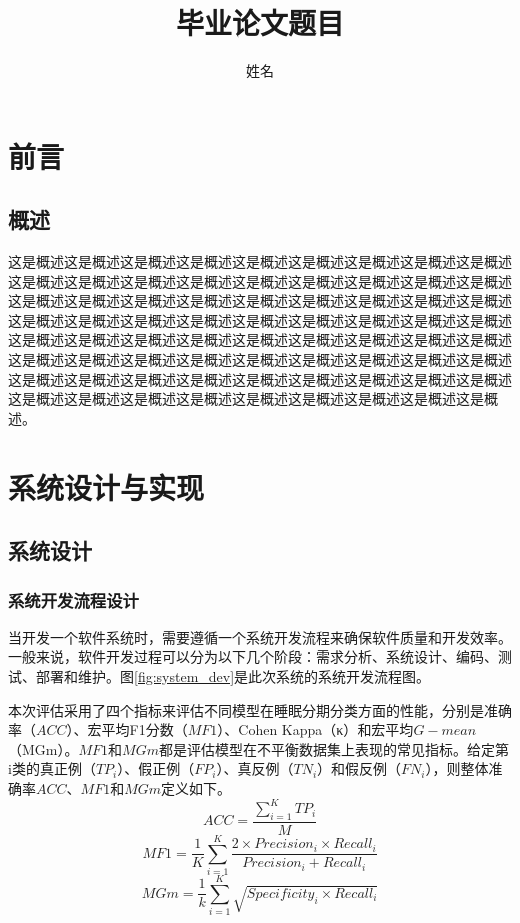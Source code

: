 \documentclass[12pt,a4paper]{SWUThesis}
\title{毕业论文题目}                           %
\author{姓名}                                 %
\begin{document}
\maketitle
\makecontents
\makeabstract
\section{前言}

\subsection{概述}
\par 这是概述这是概述这是概述这是概述这是概述这是概述这是概述这是概述这是概述这是概述这是概述这是概述这是概述这是概述这是概述这是概述这是概述这是概述这是概述这是概述这是概述这是概述这是概述这是概述这是概述这是概述这是概述这是概述这是概述这是概述这是概述这是概述这是概述这是概述这是概述这是概述这是概述这是概述这是概述这是概述这是概述这是概述这是概述这是概述这是概述这是概述这是概述这是概述这是概述这是概述这是概述这是概述这是概述这是概述这是概述这是概述这是概述这是概述这是概述这是概述这是概述这是概述这是概述这是概述这是概述这是概述这是概述这是概述这是概述这是概述这是概述这是概述。


\newpage

\section{系统设计与实现}
\subsection{系统设计}
\subsubsection{系统开发流程设计}
当开发一个软件系统时，需要遵循一个系统开发流程来确保软件质量和开发效率。一般来说，软件开发过程可以分为以下几个阶段：需求分析、系统设计、编码、测试、部署和维护。图\ref{fig:system_dev}是此次系统的系统开发流程图。

本次评估采用了四个指标来评估不同模型在睡眠分期分类方面的性能，分别是准确率（$ACC$）、宏平均F1分数（$MF1$）、Cohen Kappa（κ）\cite{cohen1960coefficient}和宏平均$G-mean$（MGm）。$MF1$和$MGm$都是评估模型在不平衡数据集上表现的常见指标。给定第i类的真正例（$TP_i$）、假正例（$FP_i$）、真反例（$TN_i$）和假反例（$FN_i$），则整体准确率$ACC$、$MF1$和$MGm$定义如下。
\begin{equation}
    ACC = \frac{\sum_{i=1}^{K}TP_i}{M}
\end{equation}
\begin{equation}
    MF1 = \frac{1}{K}\sum_{i=1}^{K}\frac{2\times Precision_i \times Recall_i}{Precision_i + Recall_i}
\end{equation}
\begin{equation}
    MGm = \frac{1}{k}\sum_{i=1}^{K}\sqrt{Specificity_i\times Recall_i}
\end{equation}
\end{document}
